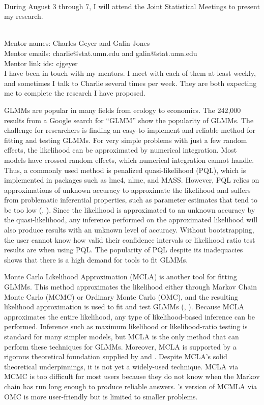 \documentclass[12pt]{article}
\newcommand{\pcite}[1]{\citeauthor{#1}'s \citeyearpar{#1}}
\newcommand{\ncite}[1]{\citeauthor{#1}, \citeyear{#1}}
\begin{document}
\\
During August 3 through 7, I will  attend the Joint Statistical Meetings to present my research.

 \medskip

\\
Mentor names: Charles Geyer and Galin Jones\\
Mentor emails: charlie@stat.umn.edu and galin@stat.umn.edu\\
Mentor link ids: cjgeyer\\
I have been in touch with my mentors.  I meet with each of them at least weekly, and sometimes I talk to Charlie several times per week.  They are both expecting me to complete the research I have proposed.

 \medskip
{}

GLMMs are popular in many fields from ecology to economics. The 242,000 results from a Google search for ``GLMM'' show the popularity of GLMMs.  The challenge for researchers is finding an easy-to-implement and reliable method for fitting and testing GLMMs. For very simple problems with just a few random effects, the likelihood can be approximated by numerical integration.  Most models have crossed random effects, which numerical integration cannot handle. Thus, a commonly used method is penalized quasi-likelihood (PQL), which is  implemented in packages such as lme4, nlme, and MASS. However, PQL relies on approximations of unknown accuracy to approximate the likelihood and suffers from problematic inferential properties, such as parameter estimates that tend to be too low (\ncite{mccu:sear:2001}). Since the likelihood is approximated to an unknown accuracy by the quasi-likelihood, any inference performed on the approximated likelihood will also produce results with an unknown level of accuracy.  Without bootstrapping, the user cannot know how valid their confidence intervals or likelihood ratio test results are when using PQL.  The popularity of PQL despite its inadequacies shows that there is a high demand for tools to fit GLMMs.


Monte Carlo  Likelihood Approximation (MCLA) is another tool for fitting GLMMs. This method approximates the likelihood either through Markov Chain Monte Carlo (MCMC) or Ordinary Monte Carlo (OMC), and the resulting likelihood approximation is used to fit and test GLMMs (\ncite{geyer:thom:1992}).   Because MCLA approximates the entire likelihood, any type of likelihood-based inference can be performed.  Inference such as maximum likelihood or likelihood-ratio testing is standard for many simpler models, but MCLA is the only method that can perform these techniques for GLMMs.  Moreover, MCLA is supported by a rigorous theoretical foundation supplied by \citet{geyer:1994} and  \citet{sung:geyer:2007}. Despite MCLA's solid theoretical underpinnings, it is not yet a widely-used technique. MCLA via MCMC is  too difficult for most users because they do not know when the Markov chain has run long enough to produce reliable answers.  \pcite{sung:geyer:2007} version of MCMLA via OMC is more user-friendly but is limited to smaller problems.
\end{document}
